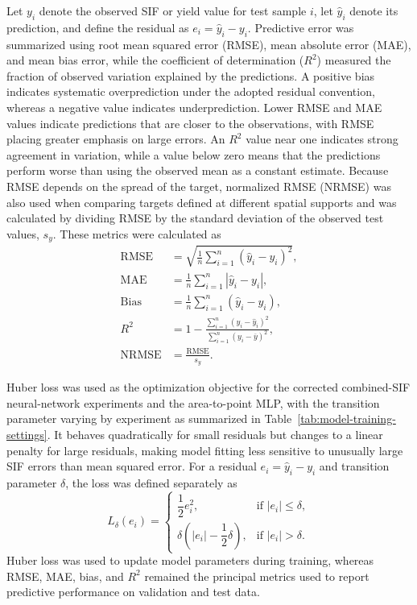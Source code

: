 Let $y_i$ denote the observed SIF or yield value for test sample $i$, let $\widehat{y}_i$ denote its prediction, and define the residual as $e_i=\widehat{y}_i-y_i$. Predictive error was summarized using root mean squared error (RMSE), mean absolute error (MAE), and mean bias error, while the coefficient of determination ($R^2$) measured the fraction of observed variation explained by the predictions. A positive bias indicates systematic overprediction under the adopted residual convention, whereas a negative value indicates underprediction. Lower RMSE and MAE values indicate predictions that are closer to the observations, with RMSE placing greater emphasis on large errors. An $R^2$ value near one indicates strong agreement in variation, while a value below zero means that the predictions perform worse than using the observed mean as a constant estimate. Because RMSE depends on the spread of the target, normalized RMSE (NRMSE) was also used when comparing targets defined at different spatial supports and was calculated by dividing RMSE by the standard deviation of the observed test values, $s_y$. These metrics were calculated as
\begin{equation}
\begin{aligned}
    \mathrm{RMSE} &= \sqrt{\frac{1}{n}\sum_{i=1}^{n}\left(\widehat{y}_i-y_i\right)^2}, \\
    \mathrm{MAE} &= \frac{1}{n}\sum_{i=1}^{n}\left|\widehat{y}_i-y_i\right|, \\
    \mathrm{Bias} &= \frac{1}{n}\sum_{i=1}^{n}\left(\widehat{y}_i-y_i\right), \\
    R^2 &= 1-\frac{\sum_{i=1}^{n}\left(y_i-\widehat{y}_i\right)^2}
    {\sum_{i=1}^{n}\left(y_i-\overline{y}\right)^2}, \\
    \mathrm{NRMSE} &= \frac{\mathrm{RMSE}}{s_y}.
\end{aligned}
\label{eq:evaluation_metrics}
\end{equation}

Huber loss was used as the optimization objective for the corrected combined-SIF neural-network experiments and the area-to-point MLP, with the transition parameter varying by experiment as summarized in Table~\ref{tab:model-training-settings}. It behaves quadratically for small residuals but changes to a linear penalty for large residuals, making model fitting less sensitive to unusually large SIF errors than mean squared error. For a residual $e_i=\widehat{y}_i-y_i$ and transition parameter $\delta$, the loss was defined separately as
\begin{equation}
    L_{\delta}(e_i)=
    \begin{cases}
        \dfrac{1}{2}e_i^2, & \text{if } |e_i|\leq\delta, \\
        \delta\left(|e_i|-\dfrac{1}{2}\delta\right), & \text{if } |e_i|>\delta.
    \end{cases}
    \label{eq:huber_loss}
\end{equation}
Huber loss was used to update model parameters during training, whereas RMSE, MAE, bias, and $R^2$ remained the principal metrics used to report predictive performance on validation and test data.


